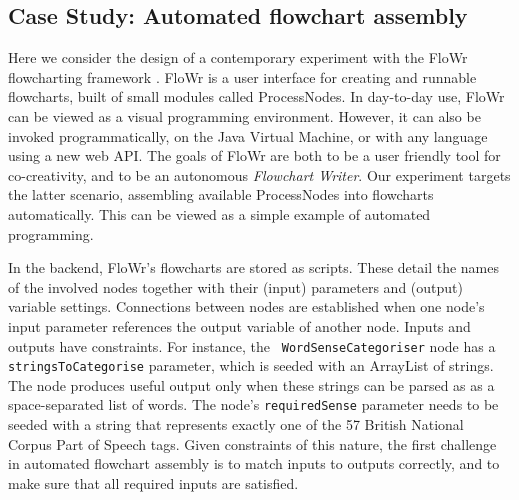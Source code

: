 \subsection{Case Study: Automated flowchart assembly} \label{sec:flowchartassembly}

Here we consider the design of a contemporary experiment with the
{\sf FloWr} flowcharting framework \cite{colton-flowcharting}.  {\sf FloWr} is a
user interface for creating and runnable flowcharts, built of small
modules called ProcessNodes.  In day-to-day use, {\sf FloWr} can be viewed
as a visual programming environment.  However, it can also be invoked
programmatically, on the Java Virtual Machine, or with any language
using a new web API.  The goals of {\sf FloWr} are both to be a user
friendly tool for co-creativity, and to be an autonomous
\emph{Flowchart Writer}.  Our experiment targets the latter scenario,
assembling available ProcessNodes into flowcharts automatically.  This can be viewed as a simple example of automated programming.

In the backend, {\sf FloWr}'s flowcharts are stored as scripts.  These
detail the names of the involved nodes together with their (input)
parameters and (output) variable settings.  Connections between nodes
are established when one node's input parameter references the output
variable of another node.
%
Inputs and outputs have constraints.  For instance, the {\tt
  WordSenseCategoriser} node has a {\tt stringsToCategorise}
parameter, which is seeded with an ArrayList of strings.  The node
produces useful output only when these strings can be parsed as as a
space-separated list of words.  The node's {\tt requiredSense}
parameter needs to be seeded with a string that represents exactly one
of the 57 British National Corpus Part of Speech tags.  Given
constraints of this nature, the first challenge in automated flowchart
assembly is to match inputs to outputs correctly, and to make sure
that all required inputs are satisfied.

